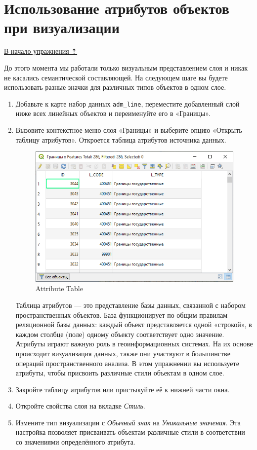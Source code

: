 \documentclass[
  12pt,
]{book}
\begin{document}
\hypertarget{map-design-general-attributes}{%
\section{Использование атрибутов объектов при визуализации}\label{map-design-general-attributes}}

\protect\hyperlink{map-design-general}{В начало упражнения ⇡}

До этого момента мы работали только визуальным представлением слоя и никак не касались семантической составляющей. На следующем шаге вы будете использовать разные значки для различных типов объектов в одном слое.

\begin{enumerate}
\def\labelenumi{\arabic{enumi}.}
\item
  Добавьте к карте набор данных \texttt{adm\_line}, переместите добавленный слой ниже всех линейных объектов и переименуйте его в «Границы».
\item
  Вызовите контекстное меню слоя «Границы» и выберите опцию «Открыть таблицу атрибутов». Откроется таблица атрибутов источника данных.

  \begin{figure}
  \centering
  \includegraphics{images/Ex01/AttributeTable.png}
  \caption{Attribute Table}
  \end{figure}

  Таблица атрибутов --- это представление базы данных, связанной с набором пространственных объектов. База функционирует по общим правилам реляционной базы данных: каждый объект представляется одной «строкой», в каждом столбце (поле) одному объекту соответствует одно значение. Атрибуты играют важную роль в геоинформационных системах. На их основе происходит визуализация данных, также они участвуют в большинстве операций пространственного анализа. В этом упражнении вы используете атрибуты, чтобы присвоить различные стили объектам в одном слое.
\item
  Закройте таблицу атрибутов или пристыкуйте её к нижней части окна.
\item
  Откройте свойства слоя на вкладке \emph{Стиль}.
\item
  Измените тип визуализации с \emph{Обычный знак} на \emph{Уникальные значения}. Эта настройка позволяет присваивать объектам различные стили в соответствии со значениями определённого атрибута.


\end{enumerate}
\end{document}
